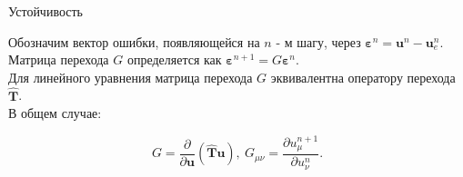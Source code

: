 \documentclass[10pt,xcolor=pst,aspectratio=169]{beamer}
\begin{document}
%
%
%
%

\begin{frame}{Устойчивость}

    \transdissolve[duration=0.1]
    \justifying
    \large

    Обозначим вектор ошибки, появляющейся на $n$ - м шагу, через $\bm{\varepsilon}^{n} = \mathbf{u}^{n} - \mathbf{u}^{n}_{e}$.\\

    Матрица перехода $G$ определяется как $\bm{\varepsilon}^{n + 1} = G \bm{\varepsilon}^{n}$.\\

    Для линейного уравнения матрица перехода $G$ эквивалентна оператору перехода $\hat{\textbf{T}}$.\\

    В общем случае:

    \[
        G = \frac{\partial}{\partial \textbf{u}} \left( \hat{\textbf{T}} \textbf{u} \right), \: G_{\mu \nu} = \frac{\partial u^{n + 1}_{\mu}}{\partial u^{n}_{\nu}}.
    \]

\end{frame}
\end{document}
